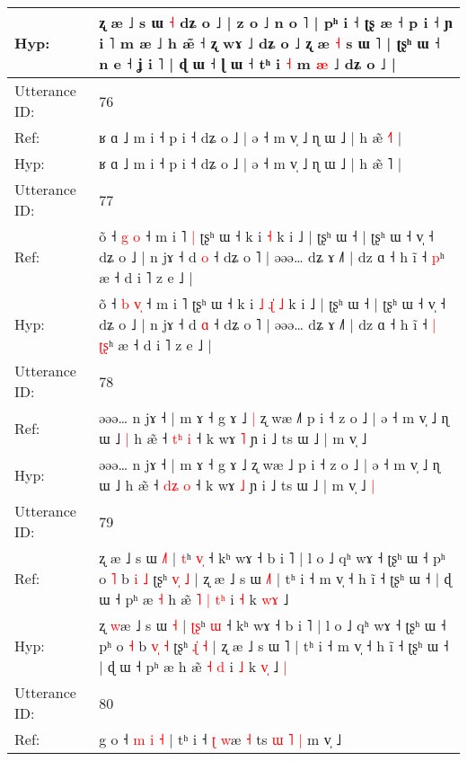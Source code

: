 \documentclass[10pt]{article}
\DeclareRobustCommand{\hl}[1]{{\textcolor{red}{#1}}}
\begin{document}
\begin{longtable}{ll}
 \\
Hyp: & ʐ æ ˩ s ɯ\hl{}\hl{}\hl{} \hl{˧} dʑ o ˩ | z o ˩ n o ˥ | pʰ i ˧ ʈʂ æ ˧ p i ˧ ɲ i ˥ m æ ˩\hl{}\hl{} h æ\hl{̃} ˧ ʐ wɤ ˩ dʑ o ˩\hl{}\hl{} ʐ æ \hl{˧} s ɯ \hl{}˥ | ʈʂʰ ɯ ˧ n e ˧ ʝ i ˥ | ɖ ɯ ˧ ɭ ɯ ˧ tʰ i \hl{˧} m \hl{}\hl{æ} ˩ dʑ o ˩ |
 \\
\midrule
Utterance ID: & 76 \\
Ref: & ʁ ɑ ˩ m i ˧ p i ˧ dʑ o ˩ | ə ˧ m v̩ ˩ ɳ ɯ ˩ | h æ̃ \hl{˧}˥ |
 \\
Hyp: & ʁ ɑ ˩ m i ˧ p i ˧ dʑ o ˩ | ə ˧ m v̩ ˩ ɳ ɯ ˩ | h æ̃ \hl{}˥ |
 \\
\midrule
Utterance ID: & 77 \\
Ref: & õ ˧ \hl{g} \hl{}\hl{o} ˧ m i ˥\hl{ }\hl{|} ʈʂʰ ɯ ˧ k i\hl{}\hl{}\hl{}\hl{}\hl{} \hl{˧} k i ˩ | ʈʂʰ ɯ ˧ | ʈʂʰ ɯ ˧ v̩ ˧ dʑ o ˩ | n jɤ ˧ d \hl{o} ˧ dʑ o ˥ | əəə… dʑ ɤ ˩˥ | dz ɑ ˧ h ĩ ˧\hl{}\hl{} \hl{}\hl{p}ʰ æ ˧ d i ˥ z e ˩ |
 \\
Hyp: & õ ˧ \hl{b} \hl{v}\hl{̩} ˧ m i ˥\hl{}\hl{} ʈʂʰ ɯ ˧ k i\hl{ }\hl{˩}\hl{ }\hl{ɻ}\hl{̍} \hl{˩} k i ˩ | ʈʂʰ ɯ ˧ | ʈʂʰ ɯ ˧ v̩ ˧ dʑ o ˩ | n jɤ ˧ d \hl{ɑ} ˧ dʑ o ˥ | əəə… dʑ ɤ ˩˥ | dz ɑ ˧ h ĩ ˧\hl{ }\hl{|} \hl{ʈ}\hl{ʂ}ʰ æ ˧ d i ˥ z e ˩ |
 \\
\midrule
Utterance ID: & 78 \\
Ref: & əəə… n jɤ ˧ | m ɤ ˧ g ɤ ˩\hl{ }\hl{|} ʐ wæ ˩\hl{˥} p i ˧ z o ˩ | ə ˧ m v̩ ˩ ɳ ɯ ˩\hl{ }\hl{|} h æ̃ ˧ \hl{t}\hl{ʰ} \hl{i} ˧ k wɤ \hl{˥} ɲ i ˩ ts ɯ ˩ | m v̩ ˩\hl{}\hl{}
 \\
Hyp: & əəə… n jɤ ˧ | m ɤ ˧ g ɤ ˩\hl{}\hl{} ʐ wæ ˩\hl{} p i ˧ z o ˩ | ə ˧ m v̩ ˩ ɳ ɯ ˩\hl{}\hl{} h æ̃ ˧ \hl{d}\hl{ʑ} \hl{o} ˧ k wɤ \hl{˩} ɲ i ˩ ts ɯ ˩ | m v̩ ˩\hl{ }\hl{|}
 \\
\midrule
Utterance ID: & 79 \\
Ref: & ʐ \hl{}æ ˩ s ɯ \hl{˩}\hl{˥} | \hl{}\hl{t}ʰ \hl{v}\hl{̩} ˧ kʰ wɤ ˧ b i ˥ | l o ˩ qʰ wɤ ˧ ʈʂʰ ɯ ˧ pʰ o \hl{˥} b \hl{}\hl{i} \hl{˩} ʈʂʰ \hl{v}\hl{̩} \hl{˩} | ʐ æ ˩ s ɯ \hl{˩}˥ | tʰ i ˧ m v̩ ˧ h ĩ ˧ ʈʂʰ ɯ ˧ | ɖ ɯ ˧ pʰ æ\hl{ }\hl{˧} h æ̃\hl{ }\hl{˥} \hl{|} \hl{t}\hl{ʰ} i \hl{˧} k \hl{w}\hl{ɤ} ˩\hl{}\hl{}
 \\
Hyp: & ʐ \hl{w}æ ˩ s ɯ \hl{}\hl{˧} | \hl{ʈ}\hl{ʂ}ʰ \hl{}\hl{ɯ} ˧ kʰ wɤ ˧ b i ˥ | l o ˩ qʰ wɤ ˧ ʈʂʰ ɯ ˧ pʰ o \hl{˧} b \hl{v}\hl{̩} \hl{˧} ʈʂʰ \hl{ɻ}\hl{̍} \hl{˧} | ʐ æ ˩ s ɯ \hl{}˥ | tʰ i ˧ m v̩ ˧ h ĩ ˧ ʈʂʰ ɯ ˧ | ɖ ɯ ˧ pʰ æ\hl{}\hl{} h æ̃\hl{}\hl{} \hl{˧} \hl{}\hl{d} i \hl{˩} k \hl{v}\hl{̩} ˩\hl{ }\hl{|}
 \\
\midrule
Utterance ID: & 80 \\
Ref: & g o ˧ \hl{m} \hl{}\hl{i} \hl{˧} | tʰ i ˧ \hl{ʈ} \hl{w}æ \hl{˧} ts\hl{ }\hl{ɯ} \hl{˥} \hl{|} m v̩ ˩\hl{}\hl{}

\end{longtable}
\end{document}
